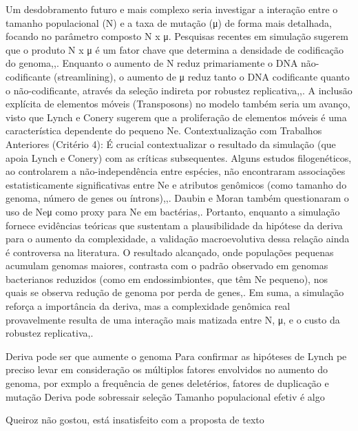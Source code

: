 Um desdobramento futuro e mais complexo seria investigar a interação entre o tamanho populacional (N) e a taxa de mutação (μ) de forma mais detalhada, focando no parâmetro composto N x μ. Pesquisas recentes em simulação sugerem que o produto N x μ é um fator chave que determina a densidade de codificação do genoma,,. Enquanto o aumento de N reduz primariamente o DNA não-codificante (streamlining), o aumento de μ reduz tanto o DNA codificante quanto o não-codificante, através da seleção indireta por robustez replicativa,,.
A inclusão explícita de elementos móveis (Transposons) no modelo também seria um avanço, visto que Lynch e Conery sugerem que a proliferação de elementos móveis é uma característica dependente do pequeno Ne.
Contextualização com Trabalhos Anteriores (Critério 4): É crucial contextualizar o resultado da simulação (que apoia Lynch e Conery) com as críticas subsequentes. Alguns estudos filogenéticos, ao controlarem a não-independência entre espécies, não encontraram associações estatisticamente significativas entre Ne e atributos genômicos (como tamanho do genoma, número de genes ou íntrons),,. Daubin e Moran também questionaram o uso de Neμ como proxy para Ne em bactérias,.
Portanto, enquanto a simulação fornece evidências teóricas que sustentam a plausibilidade da hipótese da deriva para o aumento da complexidade, a validação macroevolutiva dessa relação ainda é controversa na literatura.
O resultado alcançado, onde populações pequenas acumulam genomas maiores, contrasta com o padrão observado em genomas bacterianos reduzidos (como em endossimbiontes, que têm Ne pequeno), nos quais se observa redução de genoma por perda de genes,. Em suma, a simulação reforça a importância da deriva, mas a complexidade genômica real provavelmente resulta de uma interação mais matizada entre N, μ, e o custo da robustez replicativa,.

Deriva pode ser que aumente o genoma
Para confirmar as hipóteses de Lynch pe preciso levar em consideração os múltiplos fatores envolvidos no aumento do genoma, por exmplo a frequência de genes deletérios, fatores de duplicação e mutação
Deriva pode sobressair seleção
Tamanho populacional efetiv é algo

Queiroz não gostou, está insatisfeito com a proposta de texto
